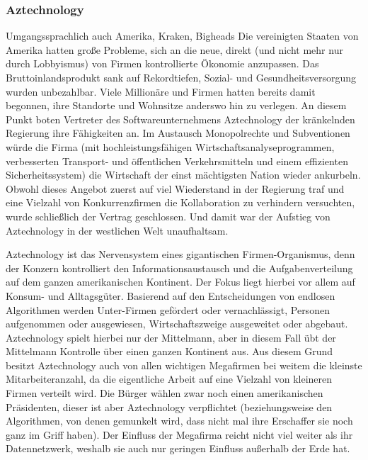 \subsubsection{Aztechnology}
Umgangssprachlich auch \glqq Amerika\grqq{}, \glqq Kraken\grqq{}, \glqq Bigheads\grqq{}
Die vereinigten Staaten von Amerika hatten große Probleme, sich an die neue, direkt (und nicht mehr nur durch Lobbyismus) von Firmen kontrollierte Ökonomie anzupassen. Das Bruttoinlandsprodukt sank auf Rekordtiefen, Sozial- und Gesundheitsversorgung wurden unbezahlbar. Viele Millionäre und Firmen hatten bereits damit begonnen, ihre Standorte und Wohnsitze anderswo hin zu verlegen. An diesem Punkt boten Vertreter des Softwareunternehmens Aztechnology der kränkelnden Regierung ihre Fähigkeiten an. Im Austausch Monopolrechte und Subventionen würde die Firma (mit hochleistungsfähigen Wirtschaftsanalyseprogrammen, verbesserten Transport- und öffentlichen Verkehrsmitteln und einem effizienten Sicherheitssystem) die Wirtschaft der einst mächtigsten Nation wieder ankurbeln. Obwohl dieses Angebot zuerst auf viel Wiederstand in der Regierung traf und eine Vielzahl von Konkurrenzfirmen die Kollaboration zu verhindern versuchten, wurde schließlich der Vertrag geschlossen. Und damit war der Aufstieg von Aztechnology in der westlichen Welt unaufhaltsam.

Aztechnology ist das Nervensystem eines gigantischen Firmen-Organismus, denn der Konzern kontrolliert den Informationsaustausch und die Aufgabenverteilung auf dem ganzen amerikanischen Kontinent. Der Fokus liegt hierbei vor allem auf Konsum- und Alltagsgüter. Basierend auf den Entscheidungen von endlosen Algorithmen werden Unter-Firmen gefördert oder vernachlässigt, Personen aufgenommen oder ausgewiesen, Wirtschaftszweige ausgeweitet oder abgebaut. Aztechnology spielt hierbei nur der Mittelmann, aber in diesem Fall übt der Mittelmann Kontrolle über einen ganzen Kontinent aus. Aus diesem Grund besitzt Aztechnology auch von allen wichtigen Megafirmen bei weitem die kleinste Mitarbeiteranzahl, da die \glqq eigentliche\grqq{} Arbeit auf eine Vielzahl von kleineren Firmen verteilt wird. Die Bürger wählen zwar noch einen amerikanischen Präsidenten, dieser ist aber Aztechnology verpflichtet (beziehungsweise den Algorithmen, von denen gemunkelt wird, dass nicht mal ihre Erschaffer sie noch ganz im Griff haben). Der Einfluss der Megafirma reicht nicht viel weiter als ihr Datennetzwerk, weshalb sie auch nur geringen Einfluss außerhalb der Erde hat.
